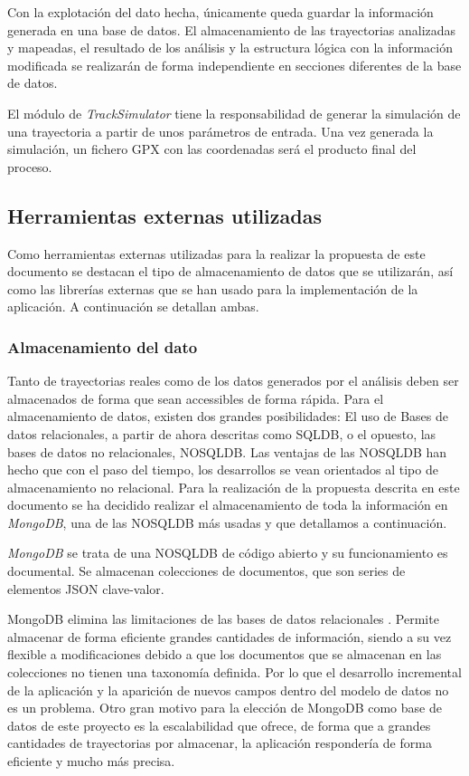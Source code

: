 Con la explotación del dato hecha, únicamente queda guardar la información generada en una base de datos.
El almacenamiento de las trayectorias analizadas y mapeadas, el resultado de los análisis y la estructura 
lógica con la información modificada se realizarán de forma independiente en secciones diferentes de la 
base de datos.

El módulo de \textit{TrackSimulator} tiene la responsabilidad de generar la simulación de una trayectoria 
a partir de unos parámetros de entrada. Una vez generada la simulación, un fichero \ac{GPX} con las 
coordenadas será el producto final del proceso.
 
\subsection{Herramientas externas utilizadas} 
Como herramientas externas utilizadas para la realizar la propuesta de este documento se destacan 
el tipo de almacenamiento de datos que se utilizarán, así como las librerías externas que se han usado 
para la implementación de la aplicación. A continuación se detallan ambas.

\subsubsection{Almacenamiento del dato}
Tanto de trayectorias reales como de los datos generados por el análisis deben ser almacenados 
de forma que sean accessibles de forma rápida.
Para el almacenamiento de datos, existen dos grandes posibilidades: El uso de Bases de datos relacionales, 
a partir de ahora descritas como \ac{SQLDB},
o el opuesto, las bases de datos no relacionales, \ac{NOSQLDB}.
Las ventajas de las \ac{NOSQLDB} han hecho que con el paso del tiempo, los desarrollos se vean orientados 
al tipo de almacenamiento no relacional.
Para la realización de la propuesta descrita en este documento se ha decidido realizar el almacenamiento de 
toda la información en \textit{MongoDB}, una de las \ac{NOSQLDB}
más usadas y que detallamos a continuación.

\textit{MongoDB} se trata de una \ac{NOSQLDB} de código abierto y su funcionamiento es documental. 
Se almacenan colecciones de documentos, que son series de elementos JSON clave-valor.

MongoDB elimina las limitaciones de las bases de datos relacionales \cite{Mongo01}. 
Permite almacenar de forma eficiente grandes cantidades de información, siendo
a su vez flexible a modificaciones debido a que los documentos que se almacenan en las colecciones no tienen 
una taxonomía definida. Por lo que el desarrollo incremental de la aplicación y la aparición de nuevos 
campos dentro del modelo de datos no es un problema.
Otro gran motivo para la elección de MongoDB como base de datos de este proyecto es la escalabilidad 
que ofrece, de forma que a grandes cantidades de trayectorias por almacenar, la aplicación respondería 
de forma eficiente y mucho más precisa.

